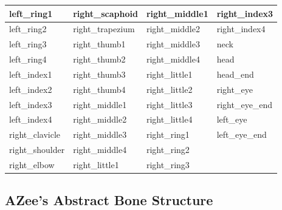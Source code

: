 \documentclass[../main.tex]{subfiles}
\begin{document}
\begin{longtable}{|l|l|l|l|}
    left\_ring1 & right\_scaphoid & right\_middle1 & right\_index3 \\ \hline
    left\_ring2 & right\_trapezium & right\_middle2 & right\_index4 \\ \hline
    left\_ring3 & right\_thumb1 & right\_middle3 & neck \\ \hline
    left\_ring4 & right\_thumb2 & right\_middle4 & head \\ \hline
    left\_index1 & right\_thumb3 & right\_little1 & head\_end \\ \hline
    left\_index2 & right\_thumb4 & right\_little2 & right\_eye \\ \hline
    left\_index3 & right\_middle1 & right\_little3 & right\_eye\_end \\ \hline
    left\_index4 & right\_middle2 & right\_little4 & left\_eye \\ \hline
    right\_clavicle & right\_middle3 & right\_ring1 & left\_eye\_end \\ \hline
    right\_shoulder & right\_middle4 & right\_ring2 &  \\ \hline
    right\_elbow & right\_little1 & right\_ring3 &  \\ \hline
\end{longtable}

\subsection{AZee's Abstract Bone Structure}
\label{annex:background_work:azee_abstract_bones}
\end{document}
